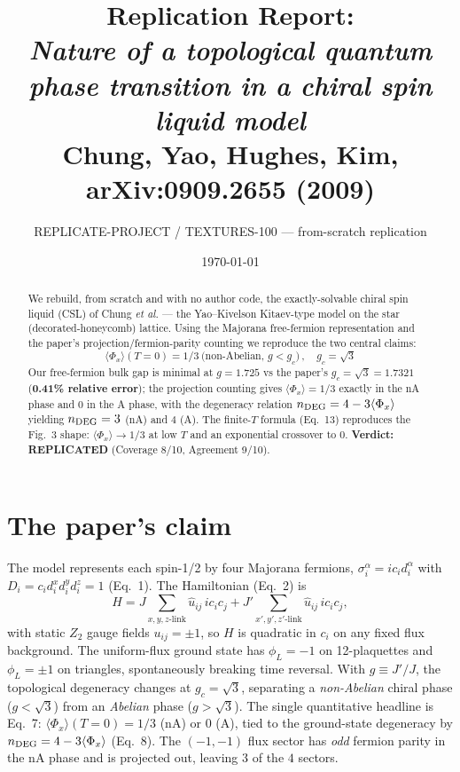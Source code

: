\documentclass[11pt]{article}
\title{Replication Report: \\ \emph{Nature of a topological quantum phase transition
in a chiral spin liquid model} \\ \small Chung, Yao, Hughes, Kim, arXiv:0909.2655 (2009)}
\author{REPLICATE-PROJECT / TEXTURES-100 --- from-scratch replication}
\date{\today}
\begin{document}
\maketitle

\begin{abstract}
We rebuild, from scratch and with no author code, the exactly-solvable chiral
spin liquid (CSL) of Chung \emph{et al.} --- the Yao--Kivelson Kitaev-type model
on the star (decorated-honeycomb) lattice. Using the Majorana free-fermion
representation and the paper's projection/fermion-parity counting we reproduce
the two central claims:
\[ \boxed{\ \langle\Phi_x\rangle(T=0) = 1/3 \ \text{(non-Abelian, } g<g_c)\,,
   \quad g_c = \sqrt{3}\ } \]
Our free-fermion bulk gap is minimal at $g=1.725$ vs the paper's
$g_c=\sqrt3=1.7321$ (\textbf{0.41\% relative error}); the projection counting
gives $\langle\Phi_x\rangle=1/3$ exactly in the nA phase and $0$ in the A phase,
with the degeneracy relation $n_{\rm DEG}=4-3\langle\Phi_x\rangle$ yielding
$n_{\rm DEG}=3$ (nA) and $4$ (A). The finite-$T$ formula (Eq.~13) reproduces the
Fig.~3 shape: $\langle\Phi_x\rangle\to1/3$ at low $T$ and an exponential
crossover to $0$. \textbf{Verdict: REPLICATED} (Coverage 8/10, Agreement 9/10).
\end{abstract}

\section{The paper's claim}
The model represents each spin-1/2 by four Majorana fermions,
$\sigma_i^\alpha = i c_i d_i^\alpha$ with $D_i=c_i d_i^x d_i^y d_i^z=1$ (Eq.~1).
The Hamiltonian (Eq.~2) is
\[ H = J\!\!\sum_{x,y,z\text{-link}}\!\! \hat u_{ij}\, i c_i c_j
     + J'\!\!\sum_{x',y',z'\text{-link}}\!\! \hat u_{ij}\, i c_i c_j , \]
with static $Z_2$ gauge fields $u_{ij}=\pm1$, so $H$ is quadratic in $c_i$ on any
fixed flux background. The uniform-flux ground state has $\phi_L=-1$ on
12-plaquettes and $\phi_L=\pm1$ on triangles, spontaneously breaking time
reversal. With $g\equiv J'/J$, the topological degeneracy changes at
$g_c=\sqrt3$, separating a \emph{non-Abelian} chiral phase ($g<\sqrt3$) from an
\emph{Abelian} phase ($g>\sqrt3$). The single quantitative headline is Eq.~7:
$\langle\Phi_x\rangle(T=0)=1/3$ (nA) or $0$ (A), tied to the ground-state
degeneracy by $n_{\rm DEG}=4-3\langle\Phi_x\rangle$ (Eq.~8). The $(-1,-1)$ flux
sector has \emph{odd} fermion parity in the nA phase and is projected out,
leaving $3$ of the $4$ sectors.
\end{document}
